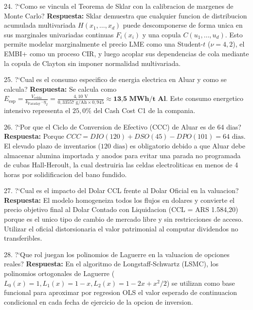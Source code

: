 \documentclass[10pt,a4paper]{article}
\theoremstyle{definition}
\begin{document}
\begin{examquestion}{24. ?`Como se vincula el Teorema de Sklar con la calibracion de margenes de Monte Carlo?}
\textbf{Respuesta:} Sklar demuestra que cualquier funcion de distribucion acumulada multivariada $H(x_1, \dots, x_d)$ puede descomponerse de forma unica en sus marginales univariadas continuas $F_i(x_i)$ y una copula $C(u_1, \dots, u_d)$. Esto permite modelar marginalmente el precio LME como una Student-$t$ ($\nu = 4,2$), el EMBI+ como un proceso CIR, y luego acoplar sus dependencias de cola mediante la copula de Clayton sin imponer normalidad multivariada.
\end{examquestion}

\begin{examquestion}{25. ?`Cual es el consumo especifico de energia electrica en Aluar y como se calcula?}
\textbf{Respuesta:} Se calcula como $E_{\text{esp}} = \frac{V_{\text{celda}}}{k_{\text{Faraday}} \cdot \eta_I} = \frac{4,10\text{ V}}{0,33557\text{ g/Ah} \times 0,945} \approx \textbf{13,5 MWh/t Al}$. Este consumo energetico intensivo representa el $25,0\%$ del Cash Cost C1 de la compania.
\end{examquestion}

\begin{examquestion}{26. ?`Por que el Ciclo de Conversion de Efectivo (CCC) de Aluar es de 64 dias?}
\textbf{Respuesta:} Porque $CCC = DIO (120) + DSO (45) - DPO (101) = 64\text{ dias}$. El elevado plazo de inventarios ($120\text{ dias}$) es obligatorio debido a que Aluar debe almacenar alumina importada y anodos para evitar una parada no programada de cubas Hall-Heroult, la cual destruiria las celdas electroliticas en menos de 4 horas por solidificacion del bano fundido.
\end{examquestion}

\begin{examquestion}{27. ?`Cual es el impacto del Dolar CCL frente al Dolar Oficial en la valuacion?}
\textbf{Respuesta:} El modelo homogeneiza todos los flujos en dolares y convierte el precio objetivo final al Dolar Contado con Liquidacion (CCL = ARS 1.584,20) porque es el unico tipo de cambio de mercado libre y sin restricciones de acceso. Utilizar el oficial distorsionaria el valor patrimonial al computar dividendos no transferibles.
\end{examquestion}

\begin{examquestion}{28. ?`Que rol juegan los polinomios de Laguerre en la valuacion de opciones reales?}
\textbf{Respuesta:} En el algoritmo de Longstaff-Schwartz (LSMC), los polinomios ortogonales de Laguerre ($L_0(x)=1, L_1(x)=1-x, L_2(x)=1-2x+x^2/2$) se utilizan como base funcional para aproximar por regresion OLS el valor esperado de continuacion condicional en cada fecha de ejercicio de la opcion de inversion.
\end{examquestion}
\end{document}
